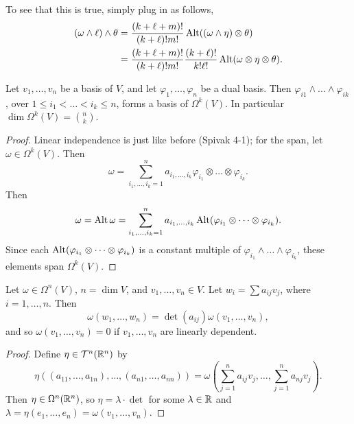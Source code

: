 To see that this is true, simply plug in as follows,
\begin{align*}
    (\omega \wedge \ell) \wedge \theta &= \frac{(k + \ell + m)!}{(k + \ell)! m!} \operatorname{Alt}((\omega \wedge \eta) \otimes \theta) \\
    &= \frac{(k + \ell + m)!}{(k + \ell)! m!} \frac{(k + \ell)!}{k! \ell!} \operatorname{Alt}(\omega \otimes \eta \otimes \theta).
\end{align*}
\begin{simpleprop}[Spivak 4-5]
    Let $v_1, \dots, v_n$ be a basis of $V$, and let $\varphi_1, \dots, \varphi_n$ be a dual basis. Then $\varphi_{i1} \wedge \dots \wedge \varphi_{ik}$, over $1 \leq i_1 < \dots < i_k \leq n$, forms a basis of $\Omega^k(V)$. In particular $\dim \Omega^k(V) = \binom{n}{k}$.
\end{simpleprop}
\begin{proof}
    Linear independence is just like before (Spivak 4-1); for the span, let $\omega \in \Omega^k(V)$. Then
    \[ \omega = \sum_{i_1, \dots, i_k = 1}^n a_{i_1, \dots, i_k} \varphi_{i_1} \otimes \dots \otimes \varphi_{i_k}. \]
    Then
    \[ \omega = \operatorname{Alt} \omega = \sum_{i_1, \dots, i_k = 1}^n a_{i_1, \dots, i_k} \operatorname{Alt}(\varphi_{i_1} \otimes \dots \otimes \varphi_{i_k}). \]
    Since each $\operatorname{Alt}(\varphi_{i_1} \otimes \dots \otimes \varphi_{i_k})$ is a constant multiple of $\varphi_{i_1} \wedge \dots \wedge \varphi_{i_k}$, these elements span $\Omega^k(V)$.
\end{proof}
\begin{simpleprop}[Spivak 4-6]
    Let $\omega \in \Omega^n(V)$, $n = \dim V$, and $v_1, \dots, v_n \in V$. Let $w_i = \sum a_{ij} v_j$, where $i = 1, \dots, n$. Then
    \[ \omega(w_1, \dots, w_n) = \det(a_{ij}) \omega(v_1, \dots, v_n), \]
    and so $\omega(v_1, \dots, v_n) = 0$ if $v_1, \dots, v_n$ are linearly dependent.
\end{simpleprop}
\begin{proof}
    Define $\eta \in \mathcal T^n(\mathbb R^n)$ by
    \[ \eta((a_{11}, \dots, a_{1n}), \dots, (a_{n1}, \dots, a_{nn})) = \omega \left( \sum_{j=1}^n a_{ij}v_j, \dots, \sum_{j=1}^n a_{nj} v_j \right). \]
    Then $\eta \in \Omega^n(\mathbb R^n)$, so $\eta = \lambda \cdot \det$ for some $\lambda \in \mathbb R$ and $\lambda = \eta(e_1, \dots, e_n) = \omega(v_1, \dots, v_n)$.
\end{proof}